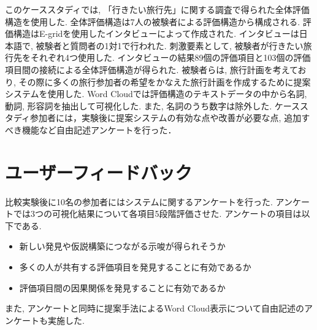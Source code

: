 \documentclass[syuuron]{kuee}
\begin{document}
		このケーススタディでは, 「行きたい旅行先」に関する調査で得られた全体評価構造を使用した. 
		全体評価構造は7人の被験者による評価構造から構成される. 
		評価構造はE-gridを使用したインタビューによって作成された. 
		インタビューは日本語で, 被験者と質問者の1対1で行われた. 
		刺激要素として, 被験者が行きたい旅行先をそれぞれ4つ使用した. 
		インタビューの結果89個の評価項目と103個の評価項目間の接続による全体評価構造が得られた. 
		被験者らは, 旅行計画を考えており, その際に多くの旅行参加者の希望をかなえた旅行計画を作成するために提案システムを使用した. 
		Word Cloudでは評価構造のテキストデータの中から名詞, 動詞, 形容詞を抽出して可視化した. 
		また, 名詞のうち数字は除外した. 
		ケーススタディ参加者には，実験後に提案システムの有効な点や改善が必要な点, 追加すべき機能など自由記述アンケートを行った．
		
	\section{ユーザーフィードバック}
		比較実験後に10名の参加者にはシステムに関するアンケートを行った. 
		アンケートでは3つの可視化結果について各項目5段階評価させた. 
		アンケートの項目は以下である. 
		
		\begin{itemize}
			\item 新しい発見や仮説構築につながる示唆が得られそうか
			\item 多くの人が共有する評価項目を発見することに有効であるか
			\item 評価項目間の因果関係を発見することに有効であるか
		\end{itemize}
		また, アンケートと同時に提案手法によるWord Cloud表示について自由記述のアンケートも実施した. 
		
\end{document}
